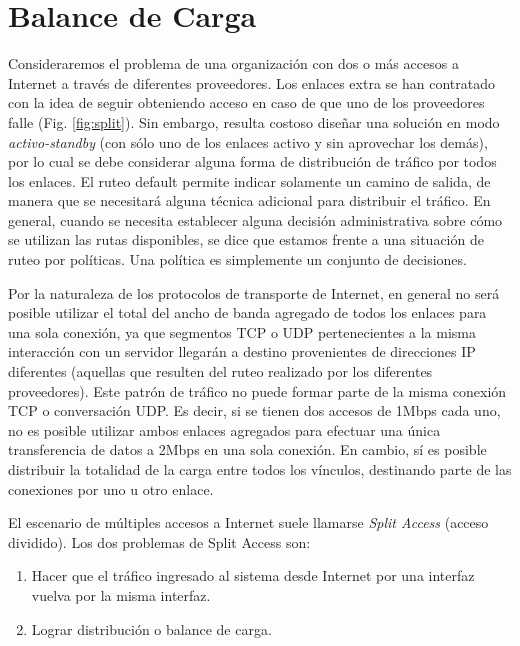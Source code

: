 \section{Balance de Carga}


Consideraremos el problema de una organización con dos o más accesos a Internet a través de diferentes proveedores. Los enlaces extra se han contratado con la idea de seguir obteniendo acceso en caso de que uno de los proveedores falle (Fig. \ref{fig:split}). Sin embargo, resulta costoso diseñar una solución en modo \textit{activo-standby} (con sólo uno de los enlaces activo y sin aprovechar los demás), por lo cual se debe considerar alguna forma de distribución de tráfico por todos los enlaces. El ruteo default permite indicar solamente un camino de salida, de manera que se necesitará alguna técnica adicional para distribuir el tráfico. En general, cuando se necesita establecer alguna decisión administrativa sobre cómo se utilizan las rutas disponibles, se dice que estamos frente a una situación de ruteo por políticas. Una política es simplemente un conjunto de decisiones. 



Por la naturaleza de los protocolos de transporte de Internet, en general no será posible utilizar el total del ancho de banda agregado de todos los enlaces para una sola conexión, ya que segmentos TCP o UDP pertenecientes a la misma interacción con un servidor llegarán a destino provenientes de direcciones IP diferentes (aquellas que resulten del ruteo realizado por los diferentes proveedores). Este patrón de tráfico no puede formar parte de la misma conexión TCP o conversación UDP. Es decir, si se tienen dos accesos de 1Mbps cada uno, no es posible utilizar ambos enlaces agregados para efectuar una única transferencia de datos a 2Mbps en una sola conexión. En cambio, sí es posible distribuir la totalidad de la carga entre todos los vínculos, destinando parte de las conexiones por uno u otro enlace. 


El escenario de múltiples accesos a Internet suele llamarse \textit{Split Access} (acceso dividido). Los dos problemas de Split Access son:

\begin{enumerate}
	\item Hacer que el tráfico ingresado al sistema desde Internet por una interfaz vuelva por la misma interfaz.
	\item Lograr distribución o balance de carga.
\end{enumerate}


